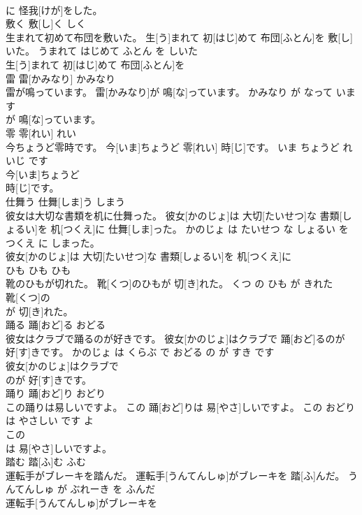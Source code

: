 \documentclass[8pt]{extreport}
\begin{document}
\begin{CJK}{UTF8}{min}
\\	に 怪我[けが]をした。		
\\	敷く	敷[し]く	しく	
\\	生まれて初めて布団を敷いた。	生[う]まれて 初[はじ]めて 布団[ふとん]を 敷[し]いた。	うまれて はじめて ふとん を しいた	
\\	生[う]まれて 初[はじ]めて 布団[ふとん]を
\\	雷	雷[かみなり]	かみなり	
\\	雷が鳴っています。	雷[かみなり]が 鳴[な]っています。	かみなり が なって います	
\\	が 鳴[な]っています。		
\\	零	零[れい]	れい	
\\	今ちょうど零時です。	今[いま]ちょうど 零[れい] 時[じ]です。	いま ちょうど れいじ です	
\\	今[いま]ちょうど
\\	時[じ]です。		
\\	仕舞う	仕舞[しま]う	しまう	
\\	彼女は大切な書類を机に仕舞った。	彼女[かのじょ]は 大切[たいせつ]な 書類[しょるい]を 机[つくえ]に 仕舞[しま]った。	かのじょ は たいせつ な しょるい を つくえ に しまった。	
\\	彼女[かのじょ]は 大切[たいせつ]な 書類[しょるい]を 机[つくえ]に
\\	ひも	ひも	ひも	
\\	靴のひもが切れた。	靴[くつ]のひもが 切[き]れた。	くつ の ひも が きれた	
\\	靴[くつ]の
\\	が 切[き]れた。		
\\	踊る	踊[おど]る	おどる	
\\	彼女はクラブで踊るのが好きです。	彼女[かのじょ]はクラブで 踊[おど]るのが 好[す]きです。	かのじょ は くらぶ で おどる の が すき です	
\\	彼女[かのじょ]はクラブで
\\	のが 好[す]きです。		
\\	踊り	踊[おど]り	おどり	
\\	この踊りは易しいですよ。	この 踊[おど]りは 易[やさ]しいですよ。	この おどり は やさしい です よ	
\\	この
\\	は 易[やさ]しいですよ。		
\\	踏む	踏[ふ]む	ふむ	
\\	運転手がブレーキを踏んだ。	運転手[うんてんしゅ]がブレーキを 踏[ふ]んだ。	うんてんしゅ が ぶれーき を ふんだ	
\\	運転手[うんてんしゅ]がブレーキを

\end{CJK}
\end{document}
